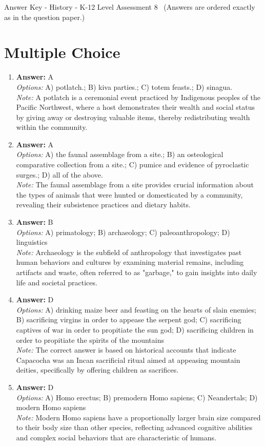\documentclass[12pt]{article}
\begin{document}
\begin{center}
Answer Key - History - K-12 Level Assessment 8 \
\small (Answers are ordered exactly as in the question paper.)
\end{center}

\section*{Multiple Choice}
\begin{enumerate}[label=\arabic*.]
\item \textbf{Answer:} A
\\ \textit{Options:} A) potlatch.; B) kiva parties.; C) totem feasts.; D) sinagua.
\\ \textit{Note:} A potlatch is a ceremonial event practiced by Indigenous peoples of the Pacific Northwest, where a host demonstrates their wealth and social status by giving away or destroying valuable items, thereby redistributing wealth within the community.
\item \textbf{Answer:} A
\\ \textit{Options:} A) the faunal assemblage from a site.; B) an osteological comparative collection from a site.; C) pumice and evidence of pyroclastic surges.; D) all of the above.
\\ \textit{Note:} The faunal assemblage from a site provides crucial information about the types of animals that were hunted or domesticated by a community, revealing their subsistence practices and dietary habits.
\item \textbf{Answer:} B
\\ \textit{Options:} A) primatology; B) archaeology; C) paleoanthropology; D) linguistics
\\ \textit{Note:} Archaeology is the subfield of anthropology that investigates past human behaviors and cultures by examining material remains, including artifacts and waste, often referred to as "garbage," to gain insights into daily life and societal practices.
\item \textbf{Answer:} D
\\ \textit{Options:} A) drinking maize beer and feasting on the hearts of slain enemies; B) sacrificing virgins in order to appease the serpent god; C) sacrificing captives of war in order to propitiate the sun god; D) sacrificing children in order to propitiate the spirits of the mountains
\\ \textit{Note:} The correct answer is based on historical accounts that indicate Capacocha was an Incan sacrificial ritual aimed at appeasing mountain deities, specifically by offering children as sacrifices.
\item \textbf{Answer:} D
\\ \textit{Options:} A) Homo erectus; B) premodern Homo sapiens; C) Neandertals; D) modern Homo sapiens
\\ \textit{Note:} Modern Homo sapiens have a proportionally larger brain size compared to their body size than other species, reflecting advanced cognitive abilities and complex social behaviors that are characteristic of humans.
\end{enumerate}
\end{document}

